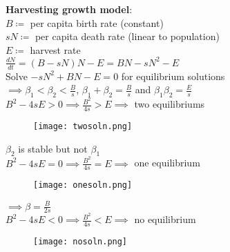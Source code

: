 \documentclass[a4paper,landscape]{article}
\newcommand{\rnname}[1]{\textbf{#1}}
\begin{document}
\begin{multicols*}{3}
\begin{flatitemize}
\item \rnname{Harvesting growth model}: \\
$B \coloneqq$ per capita birth rate (constant) \\
$sN \coloneqq$ per capita death rate (linear to population) \\
$E \coloneqq$ harvest rate \\
$\displaystyle \frac{dN}{dt}=(B-sN)N - E = BN - sN^2 - E$ \\
Solve $-sN^2+BN-E=0$ for equilibrium solutions \\
\hspace{3em} $\implies \beta_1 < \beta_2 < \frac{B}{s}$, $\beta_1 + \beta_2 = \frac{B}{s}$ and $\beta_1 \beta_2 = \frac{E}{s}$ \\
$B^2-4sE>0 \implies \frac{B^2}{4s}>E \implies$ two equilibriums \\
\begin{figure}[H]
  \texttt{[image: twosoln.png]}
\end{figure}
\hspace{5em} $\beta_2$ is stable but not $\beta_1$ \\
$B^2-4sE=0 \implies \frac{B^2}{4s}=E \implies$ one equilibrium \\
\begin{figure}[H]
  \texttt{[image: onesoln.png]}
\end{figure}
\hspace{3em} $\implies \beta = \frac{B}{2s}$ \\
$B^2-4sE<0 \implies \frac{B^2}{4s}<E \implies$ no equilibrium
\begin{figure}[H]
  \texttt{[image: nosoln.png]}
\end{figure}
\end{flatitemize}

\end{multicols*}
\end{document}
